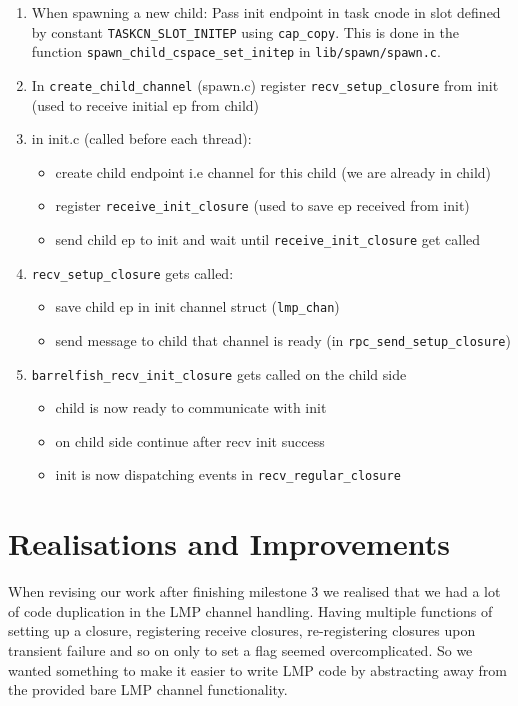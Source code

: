\begin{enumerate}
    \item When spawning a new child: Pass init endpoint in task cnode in slot defined by constant \verb|TASKCN_SLOT_INITEP| using \verb|cap_copy|. This is done in the function \verb|spawn_child_cspace_set_initep| in \verb|lib/spawn/spawn.c|.
    \item In \verb|create_child_channel| (spawn.c) register
    \verb|recv_setup_closure| from init
    (used to receive initial ep from child)
    \item in init.c (called before each thread):
        \begin{itemize}
            \item create child endpoint i.e channel for this child (we are already in child)
            \item register \verb|receive_init_closure| (used to save ep received from init)
            \item send child ep to init and wait until
            \verb|receive_init_closure| get called
        \end{itemize}
    \item \verb|recv_setup_closure| gets called:
        \begin{itemize} 
            \item save child ep in init channel struct (\verb|lmp_chan|)
            \item send message to child that channel is ready (in \verb|rpc_send_setup_closure|)
        \end{itemize}
    \item \verb|barrelfish_recv_init_closure| gets called on the child side
        \begin{itemize}
            \item child is now ready to communicate with init
            \item on child side continue after recv init success
            \item init is now dispatching events in \verb|recv_regular_closure|
        \end{itemize}
\end{enumerate}

\section{Realisations and Improvements}

When revising our work after finishing milestone 3 we realised that we had a lot of code duplication in the LMP channel handling. Having multiple functions of setting up a closure, registering receive closures, re-registering closures upon transient failure and so on only to set a flag seemed overcomplicated. So we wanted something to make it easier to write LMP code by abstracting away from the provided bare LMP channel functionality.

